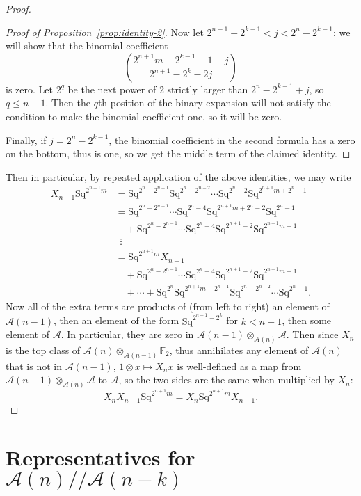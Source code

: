 \documentclass{article}
\newcommand{\A}{\mathcal{A}}
\newcommand{\F}{\mathbb{F}}
\newcommand{\Sq}{\mathrm{Sq}}
\begin{document}
\begin{proof}
\begin{proof}[Proof of Proposition~\ref{prop:identity-2}]
      Now let $2^{n-1}-2^{k-1}<j<2^n-2^{k-1}$; we will show that the binomial coefficient
      \[\binom{2^{n+1}m-2^{k-1}-1-j}{2^{n+1}-2^k-2j}\]
      is zero.  Let $2^q$ be the next power of $2$ strictly larger than $2^n-2^{k-1}+j$, so $q\leq n-1$.  Then the $q$th position of the binary expansion will not satisfy the condition to make the binomial coefficient one, so it will be zero.

      Finally, if $j=2^n-2^{k-1}$, the binomial coefficient in the second formula has a zero on the bottom, thus is one, so we get the middle term of the claimed identity.
    \end{proof}

    Then in particular, by repeated application of the above identities, we may write
    \begin{align*}
      X_{n-1}\Sq^{2^{n+1}m} &= \Sq^{2^n-2^{n-1}}\Sq^{2^n-2^{n-2}}\cdots\Sq^{2^n-2}\Sq^{2^{n+1}m+2^n-1} \\
        &= \Sq^{2^n-2^{n-1}}\cdots\Sq^{2^n-4}\Sq^{2^{n+1}m+2^n-2}\Sq^{2^n-1} \\
        &\quad + \Sq^{2^n-2^{n-1}}\cdots\Sq^{2^n-4}\Sq^{2^{n+1}-2}\Sq^{2^{n+1}m-1}\\
        &\ \;\vdots \\
        &=\Sq^{2^{n+1}m}X_{n-1}\\
        &\quad + \Sq^{2^n-2^{n-1}}\cdots\Sq^{2^n-4}\Sq^{2^{n+1}-2}\Sq^{2^{n+1}m-1}\\
        &\quad + \cdots + \Sq^{2^n}\Sq^{2^{n+1}m-2^{n-1}}\Sq^{2^n-2^{n-2}}\cdots\Sq^{2^n-1}.
    \end{align*}
    Now all of the extra terms are products of (from left to right) an element of $\A(n-1)$, then an element of the form $\Sq^{2^{n+1}-2^k}$ for $k<n+1$, then some element of $\A$.  In particular, they are zero in $\A(n-1)\otimes_{\A(n)}\A$.  Then since $X_n$ is the top class of $\A(n)\otimes_{\A(n-1)}\F_2$, thus annihilates any element of $\A(n)$ that is not in $\A(n-1)$, $1\otimes x\mapsto X_nx$ is well-defined as a map from $\A(n-1)\otimes_{\A(n)}\A$ to $\A$, so the two sides are the same when multiplied by $X_n$:
    \[X_nX_{n-1}\Sq^{2^{n+1}m} = X_n\Sq^{2^{n+1}m}X_{n-1}.\]

  \end{proof}

\section{Representatives for \boldmath$\A(n)//\A(n-k)$}
\end{document}
